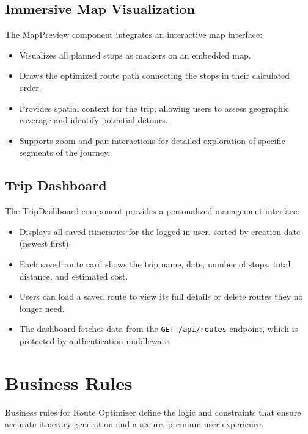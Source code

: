 \subsection{Immersive Map Visualization}
The MapPreview component integrates an interactive map interface:
\begin{itemize}
    \item Visualizes all planned stops as markers on an embedded map.
    \item Draws the optimized route path connecting the stops in their calculated order.
    \item Provides spatial context for the trip, allowing users to assess geographic coverage and identify potential detours.
    \item Supports zoom and pan interactions for detailed exploration of specific segments of the journey.
\end{itemize}

\subsection{Trip Dashboard}
The TripDashboard component provides a personalized management interface:
\begin{itemize}
    \item Displays all saved itineraries for the logged-in user, sorted by creation date (newest first).
    \item Each saved route card shows the trip name, date, number of stops, total distance, and estimated cost.
    \item Users can load a saved route to view its full details or delete routes they no longer need.
    \item The dashboard fetches data from the \texttt{GET /api/routes} endpoint, which is protected by authentication middleware.
\end{itemize}

\section{Business Rules}
Business rules for Route Optimizer define the logic and constraints that ensure accurate itinerary generation and a secure, premium user experience.

